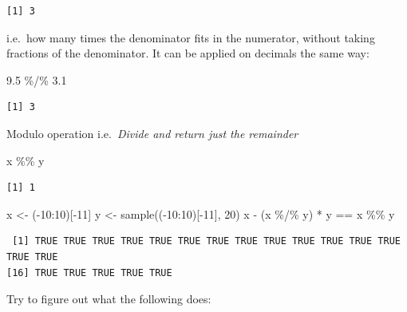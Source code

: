 \documentclass[
]{book}
\newenvironment{Shaded}{\begin{snugshade}}{\end{snugshade}}
\newcommand{\DecValTok}[1]{\textcolor[rgb]{0.00,0.00,0.81}{#1}}
\newcommand{\FloatTok}[1]{\textcolor[rgb]{0.00,0.00,0.81}{#1}}
\newcommand{\FunctionTok}[1]{\textcolor[rgb]{0.00,0.00,0.00}{#1}}
\newcommand{\NormalTok}[1]{#1}
\newcommand{\OtherTok}[1]{\textcolor[rgb]{0.56,0.35,0.01}{#1}}
\newcommand{\SpecialCharTok}[1]{\textcolor[rgb]{0.00,0.00,0.00}{#1}}
\begin{document}
\begin{verbatim}
[1] 3
\end{verbatim}

i.e.~how many times the denominator fits in the numerator, without taking fractions of the denominator. It can be applied on decimals the same way:

\begin{Shaded}
\begin{Highlighting}[]
\FloatTok{9.5} \SpecialCharTok{\%/\%} \FloatTok{3.1}
\end{Highlighting}
\end{Shaded}

\begin{verbatim}
[1] 3
\end{verbatim}

Modulo operation
i.e.~\emph{Divide and return just the remainder}

\begin{Shaded}
\begin{Highlighting}[]
\NormalTok{x }\SpecialCharTok{\%\%}\NormalTok{ y}
\end{Highlighting}
\end{Shaded}

\begin{verbatim}
[1] 1
\end{verbatim}

\begin{Shaded}
\begin{Highlighting}[]
\NormalTok{x }\OtherTok{\textless{}{-}}\NormalTok{ (}\SpecialCharTok{{-}}\DecValTok{10}\SpecialCharTok{:}\DecValTok{10}\NormalTok{)[}\SpecialCharTok{{-}}\DecValTok{11}\NormalTok{]}
\NormalTok{y }\OtherTok{\textless{}{-}} \FunctionTok{sample}\NormalTok{((}\SpecialCharTok{{-}}\DecValTok{10}\SpecialCharTok{:}\DecValTok{10}\NormalTok{)[}\SpecialCharTok{{-}}\DecValTok{11}\NormalTok{], }\DecValTok{20}\NormalTok{)}
\NormalTok{x }\SpecialCharTok{{-}}\NormalTok{ (x }\SpecialCharTok{\%/\%}\NormalTok{ y) }\SpecialCharTok{*}\NormalTok{ y }\SpecialCharTok{==}\NormalTok{ x }\SpecialCharTok{\%\%}\NormalTok{ y}
\end{Highlighting}
\end{Shaded}

\begin{verbatim}
 [1] TRUE TRUE TRUE TRUE TRUE TRUE TRUE TRUE TRUE TRUE TRUE TRUE TRUE TRUE TRUE
[16] TRUE TRUE TRUE TRUE TRUE
\end{verbatim}

Try to figure out what the following does:
\end{document}
